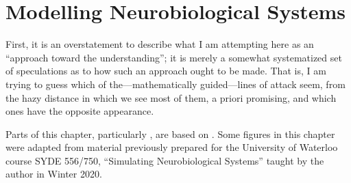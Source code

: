 
\chapter{Modelling Neurobiological Systems}
\label{chp:modelling_neurobiological_systems}

\begin{OpeningQuote}
First, it is an overstatement to describe what I am attempting here as an \enquote{approach toward the understanding}; it is merely a somewhat systematized set of speculations as to how such an approach ought to be made. That is, I am trying to guess which of the---mathematically guided---lines of attack seem, from the hazy distance in which we see most of them, a priori promising, and which ones have the opposite appearance.
\end{OpeningQuote}

\begin{PriorPublication}
Parts of this chapter, particularly , are based on \citet{stoeckel2021}.
Some figures in this chapter were adapted from material previously prepared for the University of Waterloo course SYDE 556/750, \enquote{Simulating Neurobiological Systems} taught by the author in Winter 2020.
\end{PriorPublication}



\clearpage
\setcounter{section}{0}


\clearpage
\setcounter{section}{1}


\clearpage
\setcounter{section}{2}

